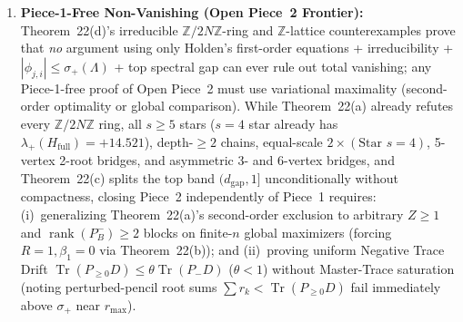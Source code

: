 \documentclass[10pt,letterpaper]{article}
\newcommand{\Tr}{\operatorname{Tr}}
\newcommand{\rank}{\operatorname{rank}}
\begin{document}
\begin{enumerate}[leftmargin=1.6em,itemsep=3pt]
\begin{itemize}[leftmargin=1.4em,itemsep=1.5pt]
    \item \emph{(O3) Genuine strict local-maximum wall ($r \ge 2$):} At $p = 4/3$, $\Lambda = \Lambda_{\mathrm{tree}}(\infty)$, the irreducible $3\times 3$ 2-root bang-bang block $\phi = (-\tau, -\tau, +\sigma_+)$ ($\tau = 0.16100024 \ll \sigma_+ = 0.16172909$) has strictly negative definite reduced Hessian of $\mathcal{R}_\Lambda$ (eigenvalues $-155{,}678.7, -388.4$), proving $r \ge 2$ bang-bang blocks are \emph{genuine strict local maxima} requiring global comparison rather than local second-order criticality.
  \end{itemize}
  Furthermore, \emph{no finite polynomial degree $d$} in our 1-state tracial SOS hierarchy can reach zero gap (stretched-exponential eigenvalues force growing moment-matrix ranks $2, 6, 12, 14$ for $s = 2,\dots,5$), and $s \to s+1$ rank-1 Darboux updates are refuted ($\sigma_2/\sigma_1$ grows $0.03 \to 0.51$ in BCH and $0.002 \to 0.233$ at $p = 4/3$) because adding a branch globally re-equilibrates the stretched-exponential Nystr\"om mesh $r_i \sim 2\beta\sqrt{i}$ (despite strict eigenvalue interlacing and rank-2 Cauchy displacement $\sinh(\pi\Delta r/\phi_*)V$ with relative SVs $[1, 1, 10^{-6}]$).
  \item \textbf{Piece-1-Free Non-Vanishing (Open Piece~2 Frontier):} Theorem~22(d)'s irreducible $\mathbb{Z}/2N\mathbb{Z}$-ring and $\mathbb{Z}$-lattice counterexamples prove that \emph{no} argument using only Holden's first-order equations + irreducibility + $|\phi_{j,i}| \le \sigma_+(\Lambda)$ + top spectral gap can ever rule out total vanishing; any Piece-1-free proof of Open Piece~2 must use variational maximality (second-order optimality or global comparison). While Theorem~22(a) already refutes every $\mathbb{Z}/2N\mathbb{Z}$ ring, all $s \ge 5$ stars ($s = 4$ star already has $\lambda_+(H_{\mathrm{full}}) = +14.521$), depth-$\ge 2$ chains, equal-scale $2\times(\text{Star } s=4)$, 5-vertex 2-root bridges, and asymmetric 3- and 6-vertex bridges, and Theorem~22(c) splits the top band $(d_{\mathrm{gap}}, 1]$ unconditionally without compactness, closing Piece~2 independently of Piece~1 requires: (i)~generalizing Theorem~22(a)'s second-order exclusion to arbitrary $Z \ge 1$ and $\rank(P_B^-) \ge 2$ blocks on finite-$n$ global maximizers (forcing $R = 1, \beta_1 = 0$ via Theorem~22(b)); and (ii)~proving uniform Negative Trace Drift $\Tr(P_{\ge 0} D) \le \theta\Tr(P_- D)$ ($\theta < 1$) without Master-Trace saturation (noting perturbed-pencil root sums $\sum r_k < \Tr(P_{\ge 0} D)$ fail immediately above $\sigma_+$ near $r_{\max}$).

\end{enumerate}
\end{document}
